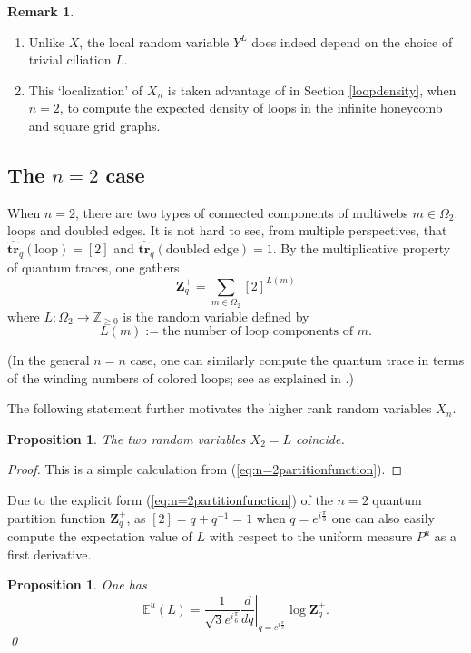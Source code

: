 \documentclass[12pt, reqno]{amsart}
\newtheorem{prop}[theo]{Proposition}
\theoremstyle{definition}
\newtheorem{rema}[theo]{Remark}
\renewcommand{\hat}{\widehat}
\newcommand{\be}{\begin{equation}}
\newcommand{\ee}{\end{equation}}
\newcommand{\Zq}{\mathbf{Z}_q}%
\newcommand{\E}{\mathbb{E}}%
\newcommand{\Z}{\mathbb{Z}}%
\newcommand{\htrq}{\hat{\mathbf{tr}}_q}%
\begin{document}
\begin{rema}
\begin{enumerate}
\item  
Unlike $X$, the local random variable $Y^L$ does indeed depend on the choice of trivial ciliation $L$.
\item  
This `localization' of $X_n$ is taken advantage of in Section \ref{loopdensity}, when $n=2$, to compute the expected density of loops in the infinite honeycomb and square grid graphs.  
\end{enumerate}
\end{rema}

\subsection{The \texorpdfstring{$n=2$}{n=2} case}\label{sssec:probabilitiesn=2}

When $n=2$, there are two types of connected components of multiwebs $m\in\Omega_2$:  loops and doubled edges.  It is not hard to see, from multiple perspectives, that $\htrq(\text{loop})=[2]$ and $\htrq(\text{doubled edge})=1$.  By the multiplicative property of quantum traces, one gathers 
\be\label{eq:n=2partitionfunction}
\Zq^+=\sum_{m\in\Omega_2}[2]^{L(m)}
\ee 
where $L:\Omega_2\to\Z_{\geq0}$ is the random variable defined by 
$$
L(m):=\text{the number of loop components of }m.
$$  

(In the general $n=n$ case, one can similarly compute the quantum trace in terms of the winding numbers of colored loops; see \cite{moy} as explained in \cite[Section 1.7]{sikora1}.)  

The following statement further motivates the higher rank random variables $X_n$.  

\begin{prop}\label{prop:n=2rv}
The two random variables $X_2=L$ coincide.  
\end{prop}

\begin{proof}
This is a simple calculation from (\ref{eq:n=2partitionfunction}).  
\end{proof}

Due to the explicit form (\ref{eq:n=2partitionfunction}) of the $n=2$ quantum partition function $\Zq^+$, as $[2]=q+q^{-1}=1$ when $q=e^{i\frac{\pi}{3}}$ one can also easily compute the expectation value of $L$ with respect to the uniform measure $P^u$ as a first derivative.

\begin{prop}\label{prop:uniform_measure}
One has
$$
 \E^u(L) = \frac{1}{\sqrt{3}  e^{i\frac{\pi}{6}}}  \left. \frac{d}{dq} \right|_{q=e^{i\frac{\pi}{3}}} \log\Zq^+.  
$$
\qed\end{prop}
\end{document}
